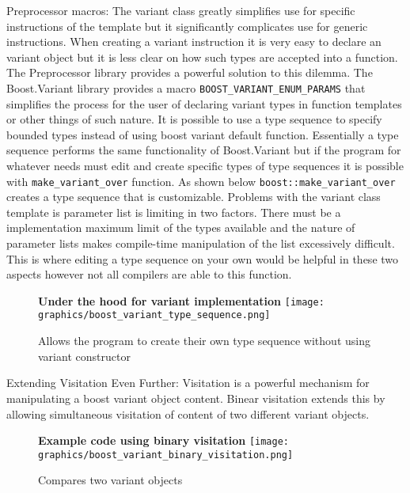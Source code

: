 \documentclass[letterpaper, 12pt]{article}
\newcommand{\inlinecode}[1]{\colorbox{codegrey}{\lstinline[language=C++]{#1}}}
\begin{document}
Preprocessor macros:
The variant class greatly simplifies use for specific instructions of the template but it
significantly complicates use for generic instructions. When creating a variant instruction
it is very easy to declare an variant object but it is less clear on how such types are
accepted into a function. The Preprocessor library provides a powerful solution to this dilemma.
The Boost.Variant library provides a macro \inlinecode{BOOST_VARIANT_ENUM_PARAMS} that
simplifies the process for the user of declaring variant types in function templates or
other things of such nature. It is possible to use a type sequence to specify bounded types
instead of using boost variant default function. Essentially a type sequence performs the
same functionality of Boost.Variant but if the program for whatever needs must edit and
create specific types of type sequences it is possible with \inlinecode{make_variant_over}
function. As shown below \inlinecode{boost::make_variant_over} creates a type sequence that
is customizable. Problems with the variant class template is parameter list is limiting in
two factors. There must be a implementation maximum limit of the types available and the
nature of parameter lists makes compile-time manipulation of the list excessively difficult.
This is where editing a type sequence on your own would be helpful in these two aspects
however not all compilers are able to this function.
\par\vspace{\baselineskip}

\begin{figure}
  \centering
  \textbf{Under the hood for variant implementation}
  \texttt{[image: graphics/boost\_variant\_type\_sequence.png]}
  \caption{Allows the program to create their own type sequence without using variant constructor}
\end{figure}

Extending Visitation Even Further:
Visitation is a powerful mechanism for manipulating a boost variant object content. Binear visitation
extends this by allowing simultaneous visitation of content of two different variant objects.
\par\vspace{\baselineskip}

\begin{figure}
  \centering
  \textbf{Example code using binary visitation}
  \texttt{[image: graphics/boost\_variant\_binary\_visitation.png]}
  \caption{Compares two variant objects}
\end{figure}
\end{document}

